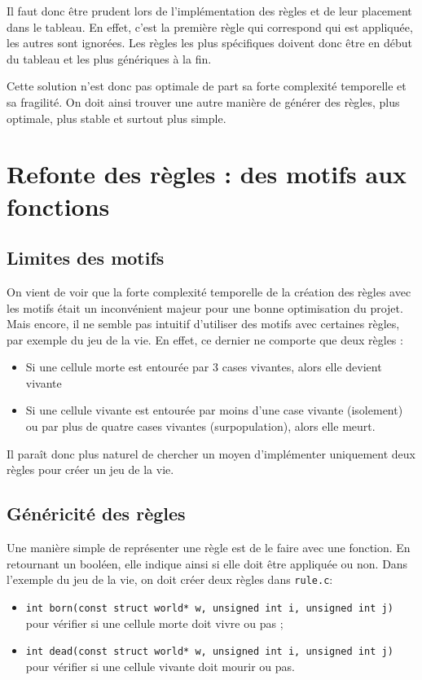 Il faut donc être prudent lors de l'implémentation des règles et de leur placement dans le tableau. En effet, c'est la première règle qui correspond qui est appliquée, les autres sont ignorées. Les règles les plus spécifiques doivent donc être en début du tableau et les plus génériques à la fin.

Cette solution n'est donc pas optimale de part sa forte complexité temporelle et sa fragilité. On doit ainsi trouver une autre manière de générer des règles, plus optimale, plus stable et surtout plus simple.

\section{Refonte des règles : des motifs aux fonctions}
\subsection{Limites des motifs}
On vient de voir que la forte complexité temporelle de la création des règles avec les motifs était un inconvénient majeur pour une bonne optimisation du projet. Mais encore, il ne semble pas intuitif d'utiliser des motifs avec certaines règles, par exemple du jeu de la vie. En effet, ce dernier ne comporte que deux règles :
\begin{itemize}
    \item Si une cellule morte est entourée par 3 cases vivantes, alors elle devient vivante
    \item Si une cellule vivante est entourée par moins d'une case vivante (isolement) ou par plus de quatre cases vivantes (surpopulation), alors elle meurt.
\end{itemize}
Il paraît donc plus naturel de chercher un moyen d'implémenter uniquement deux règles pour créer un jeu de la vie.
\subsection{Généricité des règles}
Une manière simple de représenter une règle est de le faire avec une fonction. En retournant un booléen, elle indique ainsi si elle doit être appliquée ou non. Dans l'exemple du jeu de la vie, on doit créer deux règles dans \texttt{rule.c}:
\begin{itemize}
    \item \lstinline{int born(const struct world* w, unsigned int i, unsigned int j)} pour vérifier si une cellule morte doit vivre ou pas ;
    \item \lstinline{int dead(const struct world* w, unsigned int i, unsigned int j)} pour vérifier si une cellule vivante doit mourir ou pas.
\end{itemize}

